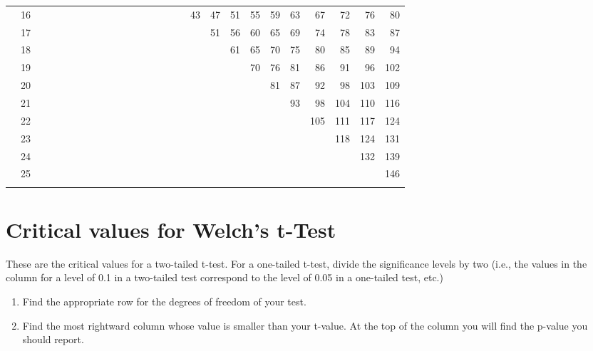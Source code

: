 \begin{table}[H]
{\begin{tabular}[t]{*{27}{r}}
 & 16 &  &  &  &  &  &  &  &  &  &  &  &  &  &  &  & 43 & 47 & 51 & 55 & 59 & 63 & 67 & 72 & 76 & 80\\
 & 17 &  &  &  &  &  &  &  &  &  &  &  &  &  &  &  &  & 51 & 56 & 60 & 65 & 69 & 74 & 78 & 83 & 87\\
 & 18 &  &  &  &  &  &  &  &  &  &  &  &  &  &  &  &  &  & 61 & 65 & 70 & 75 & 80 & 85 & 89 & 94\\
 & 19 &  &  &  &  &  &  &  &  &  &  &  &  &  &  &  &  &  &  & 70 & 76 & 81 & 86 & 91 & 96 & 102\\
 & 20 &  &  &  &  &  &  &  &  &  &  &  &  &  &  &  &  &  &  &  & 81 & 87 & 92 & 98 & 103 & 109\\
 & 21 &  &  &  &  &  &  &  &  &  &  &  &  &  &  &  &  &  &  &  &  & 93 & 98 & 104 & 110 & 116\\
 & 22 &  &  &  &  &  &  &  &  &  &  &  &  &  &  &  &  &  &  &  &  &  & 105 & 111 & 117 & 124\\
 & 23 &  &  &  &  &  &  &  &  &  &  &  &  &  &  &  &  &  &  &  &  &  &  & 118 & 124 & 131\\
 & 24 &  &  &  &  &  &  &  &  &  &  &  &  &  &  &  &  &  &  &  &  &  &  &  & 132 & 139\\
 & 25 &  &  &  &  &  &  &  &  &  &  &  &  &  &  &  &  &  &  &  &  &  &  &  &  & 146\\
\lspbottomrule
\end{tabular}}
\end{table}


\section{Critical values for Welch's t-Test}
\label{sec:ttestcriticalvalues}

These are the critical values for a two-tailed t-test. For a one-tailed t-test, divide the significance levels by two (i.e., the values in the column for a level of 0.1 in a two-tailed test correspond to the level of 0.05 in a one-tailed test, etc.)

\begin{enumerate}
  \item Find the appropriate row for the degrees of freedom of your test.
  \item Find the most rightward column whose value is smaller than your t-value. At the top of the column you will find the p-value you should report.
\end{enumerate}

